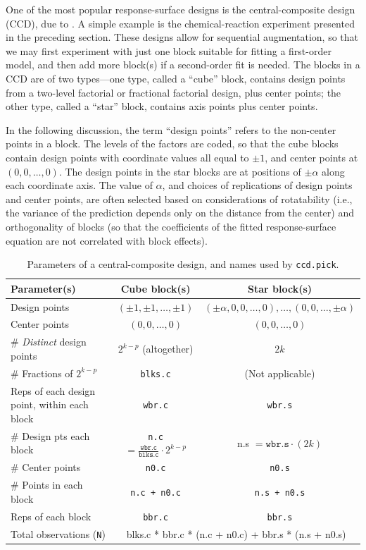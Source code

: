 \documentclass[article,nojss]{jss}
\begin{document}
One of the most popular response-surface designs is the central-composite design (CCD), due to \cite{Box51}.  A simple example is the chemical-reaction experiment presented in the preceding section.  These designs allow for sequential augmentation, so that we may first experiment with just one block suitable for fitting a first-order model, and then add more block(s) if a second-order fit is needed.  
The blocks in a CCD are of two types---one type, called a ``cube'' block, contains design points from a two-level factorial or fractional factorial design, plus center points; the other type, called a ``star'' block, contains axis points plus center points.  

In the following discussion, the term ``design points'' refers to the non-center points in a block.  The levels of the factors are coded, so that the cube blocks contain design points with coordinate values all equal to $\pm1$, and center points at $(0,0,\ldots,0)$.  The design points in the star blocks are at positions of $\pm\alpha$ along each coordinate axis.  The value of $\alpha$, and choices of replications of design points and center points, are often selected based on considerations of rotatability (i.e., the variance of the prediction depends only on the distance from the center) and orthogonality of blocks (so that the coefficients of the fitted response-surface equation are not correlated with block effects).

\begin{table}[t!]
\begin{center}
\def\arraystretch{1.5}
\begin{tabular}{|p{1.72in}|c|c|}
\hline
Parameter(s) & Cube block(s) & Star block(s) \\ 
\hline
Design points & $(\pm1,\pm1,\ldots,\pm1)$
    & $(\pm\alpha,0,0,\ldots,0),\ldots,(0,0,\ldots,\pm\alpha)$ \\
Center points & $(0,0,\ldots,0)$ & $(0,0,\ldots,0)$ \\ 
\hline
\# \emph{Distinct} design points 
  & $2^{k-p}$ (altogether)
  & $2k$\\
\# Fractions of $2^{k-p}$
  & \texttt{blks.c}  & (Not applicable)\\
Reps of each design point, within each block
  & \texttt{wbr.c} & \texttt{wbr.s} \\
\# Design pts each block
  & \texttt{n.c} $= \mathtt{\frac{wbr.c}{blks.c}}\cdot2^{k-p}$
  & n.s $=\mathtt{wbr.s}\cdot(2k)$\\
\# Center points 
  & \texttt{n0.c}  & \texttt{n0.s}\\
\# Points in each block
  & \texttt{n.c + n0.c}
  & \texttt{n.s + n0.s} \\
Reps of each block
  & \texttt{bbr.c} & \texttt{bbr.s}\\
  \hline
Total observations (\texttt{N})
  & \multicolumn{2}{|c|}{\tt \parbox{174pt}{blks.c * bbr.c * (n.c + n0.c) + bbr.s * (n.s + n0.s)}\rule[-16pt]{0pt}{36pt}}\\
\hline
\end{tabular}
\caption{\label{ccd-ref} Parameters of a central-composite design, and names used by \texttt{ccd.pick}.}
\end{center}
\end{table}
\end{document}
